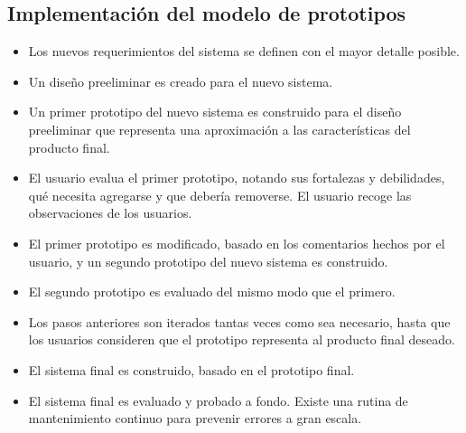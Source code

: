 \subsection{Implementación del modelo de prototipos}
\begin{itemize}
  \item Los nuevos requerimientos del sistema se definen con el mayor detalle posible.
  \item Un diseño preeliminar es creado para el nuevo sistema. 
  \item Un primer prototipo del nuevo sistema es construido para el diseño preeliminar que representa una aproximación a las características del producto final.
  \item El usuario evalua el primer prototipo, notando sus fortalezas y debilidades, qué necesita agregarse y que debería removerse. El usuario recoge las observaciones de los usuarios. 
  \item El primer prototipo es modificado, basado en los comentarios hechos por el usuario, y un segundo prototipo del nuevo sistema es construido.
  \item El segundo prototipo es evaluado del mismo modo que el primero.
  \item Los pasos anteriores son iterados tantas veces como sea necesario, hasta que los usuarios consideren que el prototipo representa al producto final deseado.
  \item El sistema final es construido, basado en el prototipo final.
  \item El sistema final es evaluado y probado a fondo. Existe una rutina de mantenimiento continuo para prevenir errores a gran escala.
\end{itemize}
